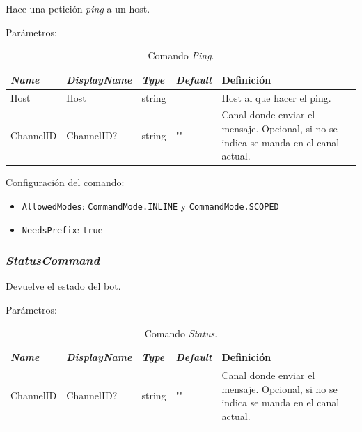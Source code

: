 Hace una petición \textit{ping} a un host.

Parámetros:

\begin{table}[H]
    \centering
    \def\arraystretch{1.25}
    \begin{adjustbox}{max width=\textwidth}
    \begin{tabularx}{\textwidth}{|l|l|l|l|L|}
    \hline
        \textbf{\textit{Name}} & \textbf{\textit{DisplayName}} & \textbf{\textit{Type}} & \textbf{\textit{Default}} & \textbf{Definición} \\ \hline
    \hline
        Host & Host & string & ~ & Host al que hacer el ping. \\ \hline
        ChannelID & ChannelID? & string & "" & Canal donde enviar el mensaje. Opcional, si no se indica se manda en el canal actual. \\ \hline
    \end{tabularx}
    \end{adjustbox}
    \caption{Comando \textit{Ping}.}
\end{table}

Configuración del comando:

\begin{itemize}
	\item \verb|AllowedModes|: \verb|CommandMode.INLINE| y \verb|CommandMode.SCOPED|
	\item \verb|NeedsPrefix|: \verb|true|
\end{itemize}


\subsubsection{\textit{StatusCommand}}

Devuelve el estado del bot.

Parámetros:

\begin{table}[H]
    \centering
    \def\arraystretch{1.25}
    \begin{adjustbox}{max width=\textwidth}
    \begin{tabularx}{\textwidth}{|l|l|l|l|L|}
    \hline
        \textbf{\textit{Name}} & \textbf{\textit{DisplayName}} & \textbf{\textit{Type}} & \textbf{\textit{Default}} & \textbf{Definición} \\ \hline
    \hline
        ChannelID & ChannelID? & string & "" & Canal donde enviar el mensaje. Opcional, si no se indica se manda en el canal actual. \\ \hline
    \end{tabularx}
    \end{adjustbox}
    \caption{Comando \textit{Status}.}
\end{table}

